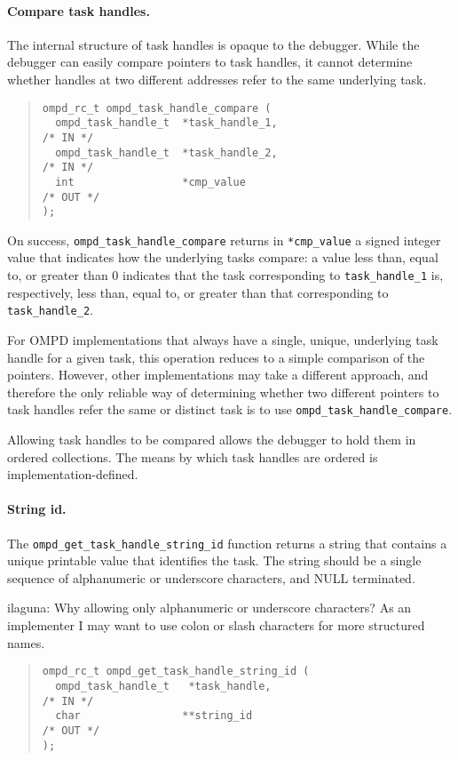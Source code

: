 \paragraph{Compare task handles.}
The internal structure of task handles is opaque to the debugger.
While the debugger can easily compare pointers to task handles,
it cannot determine whether handles at two different addresses refer
to the same underlying task.
\begin{quote}
\begin{lstlisting}
ompd_rc_t ompd_task_handle_compare (
  ompd_task_handle_t  *task_handle_1,                               /* IN */
  ompd_task_handle_t  *task_handle_2,                               /* IN */
  int                 *cmp_value                                   /* OUT */
);
\end{lstlisting}
\end{quote}
On success, \texttt{ompd\_task\_handle\_compare} returns in
\texttt{*cmp\_value} a signed integer value that indicates how
the underlying tasks compare:
a value less than, equal to, or greater than 0 indicates that
the task corresponding to \texttt{task\_handle\_1} is,
respectively, less than, equal to, or greater than that corresponding
to \texttt{task\_handle\_2}.

For OMPD implementations that always have a single, unique, underlying
task handle for a given task,
this operation reduces to a simple comparison of the pointers.
However, other implementations may take a different approach,
and therefore the only reliable way of determining whether two different
pointers to task handles refer the same or distinct
task is to use \texttt{ompd\_task\_handle\_compare}.

Allowing task handles to be compared allows the debugger to hold
them in ordered collections.
The means by which task handles are ordered is implementation-defined.

\paragraph{String id.}
The \texttt{ompd\_get\_task\_handle\_string\_id}
function returns a string that contains a unique printable
value that identifies the task.
The string should be a single sequence of alphanumeric or underscore
characters, and NULL terminated.
\begin{notes}
	ilaguna: Why allowing only alphanumeric or underscore characters? As an 
	implementer I may want to use colon or slash characters for more structured 
	names.
\end{notes}
\begin{quote}
\begin{lstlisting}
ompd_rc_t ompd_get_task_handle_string_id (
  ompd_task_handle_t   *task_handle,                                /* IN */
  char                **string_id                                  /* OUT */
);
\end{lstlisting}
\end{quote}

